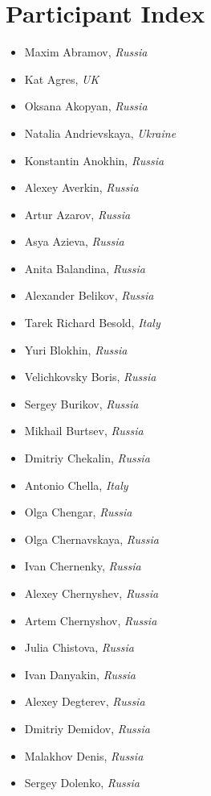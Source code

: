 \documentclass[10pt,fleqn,openany]{book} %
\begin{document}
\chapter{Participant Index}
	\begin{multicols}{2}
		\begin{itemize}
			\item Maxim Abramov, \textit{Russia}
			\item Kat Agres, \textit{UK}
			\item Oksana Akopyan, \textit{Russia}
			\item Natalia Andrievskaya, \textit{Ukraine}
			\item Konstantin Anokhin, \textit{Russia}
			\item Alexey Averkin, \textit{Russia}
			\item Artur Azarov, \textit{Russia}
			\item Asya Azieva, \textit{Russia}
			\item Anita Balandina, \textit{Russia}
			\item Alexander Belikov, \textit{Russia}
			\item Tarek Richard Besold, \textit{Italy}
			\item Yuri Blokhin, \textit{Russia}
			\item Velichkovsky Boris, \textit{Russia}
			\item Sergey Burikov, \textit{Russia}
			\item Mikhail Burtsev, \textit{Russia}
			\item Dmitriy Chekalin, \textit{Russia}
			\item Antonio Chella, \textit{Italy}
			\item Olga Chengar, \textit{Russia}
			\item Olga Chernavskaya, \textit{Russia}
			\item Ivan Chernenky, \textit{Russia}
			\item Alexey Chernyshev, \textit{Russia}
			\item Artem Chernyshov, \textit{Russia}
			\item Julia Chistova, \textit{Russia}
			\item Ivan Danyakin, \textit{Russia}
			\item Alexey Degterev, \textit{Russia}
			\item Dmitriy Demidov, \textit{Russia}
			\item Malakhov Denis, \textit{Russia}
			\item Sergey Dolenko, \textit{Russia}

\end{itemize}
\end{multicols}
\end{document}
